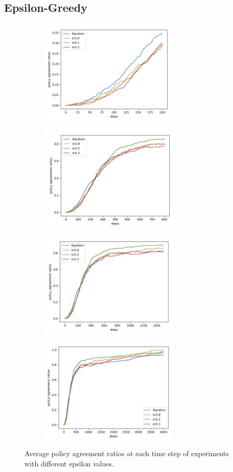 \documentclass{article}
\begin{document}
\subsection{Epsilon-Greedy}
\begin{figure}[h]
	\begin{subfigure}{0.5\textwidth}
		\includegraphics[width=0.9\linewidth, height=5cm]{images/epsilon_0_200.png} 
		\caption{}
	\end{subfigure}
	\begin{subfigure}{0.5\textwidth}
		\includegraphics[width=0.9\linewidth, height=5cm]{images/epsilon_0_800.png}
		\caption{}
	\end{subfigure}
	\begin{subfigure}{0.5\textwidth}
		\includegraphics[width=0.9\linewidth, height=5cm]{images/epsilon_0_1500.png}
		\caption{}
	\end{subfigure}
	\begin{subfigure}{0.5\textwidth}
		\includegraphics[width=0.9\linewidth, height=5cm]{images/epsilon_0_4000.png}
		\caption{}
	\end{subfigure}
	\caption{Average policy agreement ratios at each time step of experiments with different epsilon values.}
\end{figure}
\end{document}
